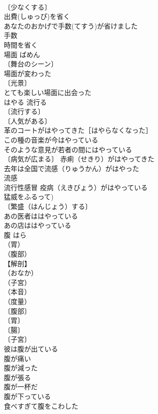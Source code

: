 \documentclass[8pt]{extreport}
\begin{document}
\begin{CJK}{UTF8}{min}
\\	〔少なくする〕　
\\	出費(しゅっぴ)を省く 
\\	あなたのおかげで手数(てすう)が省けました 
\\	手数　
\\	時間を省く 
\\	場面	ばめん	
\\	〔舞台のシーン〕
\\	場面が変わった 
\\	〔光景〕
\\	とても楽しい場面に出会った 
\\	はやる	流行る	
\\	〔流行する〕
\\	〔人気がある〕
\\	革のコートがはやってきた［はやらなくなった］ 
\\	この種の音楽が今はやっている 
\\	そのような意見が若者の間にはやっている 
\\	〔病気が広まる〕 赤痢（せきり）がはやってきた 
\\	去年は全国で流感（りゅうかん）がはやった
\\	流感　
\\	流行性感冒 疫病（えきびょう）がはやっている 
\\	猛威をふるって) 
\\	〔繁盛（はんじょう）する〕　
\\	あの医者ははやっている 
\\	あの店ははやっている 
\\	腹	はら	
\\	（胃）
\\	（腹部）
\\	【解剖】
\\	（おなか）
\\	（子宮）
\\	（本音）
\\	（度量）
\\	〔腹部〕
\\	〔胃〕
\\	〔腸〕
\\	〔子宮〕
\\	彼は腹が出ている 
\\	腹が痛い 
\\	腹が減った 
\\	腹が張る 
\\	腹が一杯だ 
\\	腹が下っている 
\\	食べすぎて腹をこわした 

\end{CJK}
\end{document}
